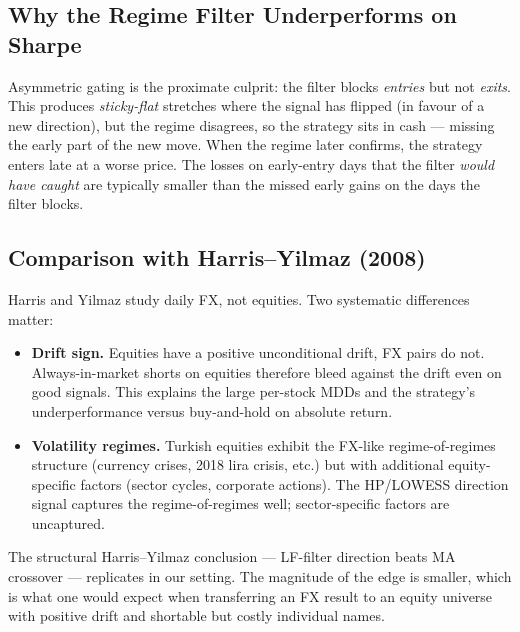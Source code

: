 \documentclass[11pt,a4paper]{article}
\begin{document}
\subsection{Why the Regime Filter Underperforms on Sharpe}

Asymmetric gating is the proximate culprit: the filter blocks \emph{entries}
but not \emph{exits}. This produces \emph{sticky-flat} stretches where the
signal has flipped (in favour of a new direction), but the regime disagrees,
so the strategy sits in cash --- missing the early part of the new move. When
the regime later confirms, the strategy enters late at a worse price. The
losses on early-entry days that the filter \emph{would have caught} are
typically smaller than the missed early gains on the days the filter blocks.

\subsection{Comparison with Harris--Yilmaz (2008)}

Harris and Yilmaz study daily FX, not equities. Two systematic differences
matter:

\begin{itemize}[leftmargin=1.5em,itemsep=2pt]
    \item \textbf{Drift sign.} Equities have a positive unconditional drift,
          FX pairs do not. Always-in-market shorts on equities therefore bleed
          against the drift even on good signals. This explains the large
          per-stock MDDs and the strategy's underperformance versus
          buy-and-hold on absolute return.
    \item \textbf{Volatility regimes.} Turkish equities exhibit the FX-like
          regime-of-regimes structure (currency crises, 2018 lira crisis, etc.)
          but with additional equity-specific factors (sector cycles, corporate
          actions). The HP/LOWESS direction signal captures the
          regime-of-regimes well; sector-specific factors are uncaptured.
\end{itemize}

The structural Harris--Yilmaz conclusion --- LF-filter direction beats MA
crossover --- replicates in our setting. The magnitude of the edge is smaller,
which is what one would expect when transferring an FX result to an equity
universe with positive drift and shortable but costly individual names.

\end{document}
